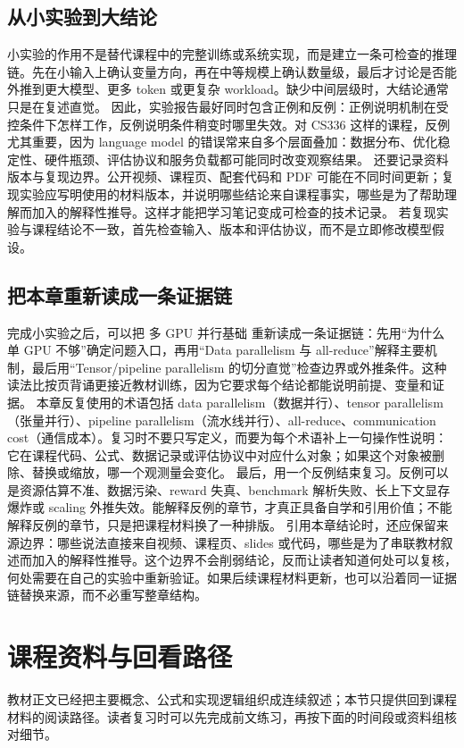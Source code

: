 \documentclass[a4paper]{article}
\begin{document}
\subsection{从小实验到大结论}
小实验的作用不是替代课程中的完整训练或系统实现，而是建立一条可检查的推理链。先在小输入上确认变量方向，再在中等规模上确认数量级，最后才讨论是否能外推到更大模型、更多 token 或更复杂 workload。缺少中间层级时，大结论通常只是在复述直觉。
因此，实验报告最好同时包含正例和反例：正例说明机制在受控条件下怎样工作，反例说明条件稍变时哪里失效。对 CS336 这样的课程，反例尤其重要，因为 language model 的错误常来自多个层面叠加：数据分布、优化稳定性、硬件瓶颈、评估协议和服务负载都可能同时改变观察结果。
还要记录资料版本与复现边界。公开视频、课程页、配套代码和 PDF 可能在不同时间更新；复现实验应写明使用的材料版本，并说明哪些结论来自课程事实，哪些是为了帮助理解而加入的解释性推导。这样才能把学习笔记变成可检查的技术记录。
若复现实验与课程结论不一致，首先检查输入、版本和评估协议，而不是立即修改模型假设。
\subsection{把本章重新读成一条证据链}
完成小实验之后，可以把 多 GPU 并行基础 重新读成一条证据链：先用“为什么单 GPU 不够”确定问题入口，再用“Data parallelism 与 all-reduce”解释主要机制，最后用“Tensor/pipeline parallelism 的切分直觉”检查边界或外推条件。这种读法比按页背诵更接近教材训练，因为它要求每个结论都能说明前提、变量和证据。
本章反复使用的术语包括 data parallelism（数据并行）、tensor parallelism（张量并行）、pipeline parallelism（流水线并行）、all-reduce、communication cost（通信成本）。复习时不要只写定义，而要为每个术语补上一句操作性说明：它在课程代码、公式、数据记录或评估协议中对应什么对象；如果这个对象被删除、替换或缩放，哪一个观测量会变化。
最后，用一个反例结束复习。反例可以是资源估算不准、数据污染、reward 失真、benchmark 解析失败、长上下文显存爆炸或 scaling 外推失效。能解释反例的章节，才真正具备自学和引用价值；不能解释反例的章节，只是把课程材料换了一种排版。
引用本章结论时，还应保留来源边界：哪些说法直接来自视频、课程页、slides 或代码，哪些是为了串联教材叙述而加入的解释性推导。这个边界不会削弱结论，反而让读者知道何处可以复核，何处需要在自己的实验中重新验证。如果后续课程材料更新，也可以沿着同一证据链替换来源，而不必重写整章结构。
\section{课程资料与回看路径}
教材正文已经把主要概念、公式和实现逻辑组织成连续叙述；本节只提供回到课程材料的阅读路径。读者复习时可以先完成前文练习，再按下面的时间段或资料组核对细节。
\end{document}
